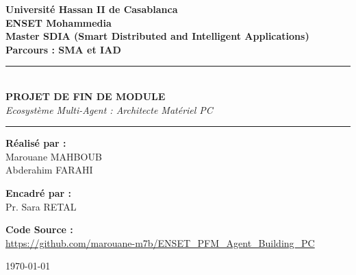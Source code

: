 \documentclass[12pt,a4paper]{article}
\begin{document}
\begin{titlepage}
    \centering
    \vspace*{1cm}
    
    {\Large \textbf{Universit\'e Hassan II de Casablanca}} \\
    {\Large \textbf{ENSET Mohammedia}} \\
    \vspace{0.5cm}
    {\large \textbf{Master SDIA (Smart Distributed and Intelligent Applications)}} \\
    {\large \textbf{Parcours : SMA et IAD}} \\
    
    \vspace{3cm}
    
    \rule{\linewidth}{0.5mm} \\
    \vspace{0.5cm}
    {\huge \textbf{PROJET DE FIN DE MODULE}} \\
    \vspace{0.3cm}
    {\Large \textit{Ecosyst\`eme Multi-Agent : Architecte Mat\'eriel PC}} \\
    \rule{\linewidth}{0.5mm}
    
    \vspace{3cm}
    
    \begin{flushleft}
        \large
        \textbf{R\'ealis\'e par :} \\
        Marouane MAHBOUB \\
        Abderahim FARAHI \\
    \end{flushleft}
    
    \vspace{1cm}
    
    \begin{flushright}
        \large
        \textbf{Encadr\'e par :} \\
        Pr. Sara RETAL
    \end{flushright}
    
    \vfill
    
    \centering
    \textbf{Code Source :} \\
    \url{https://github.com/marouane-m7b/ENSET_PFM_Agent_Building_PC}
    
    \vspace{1cm}
    {\large \today}
\end{titlepage}

\tableofcontents
\newpage
\end{document}
